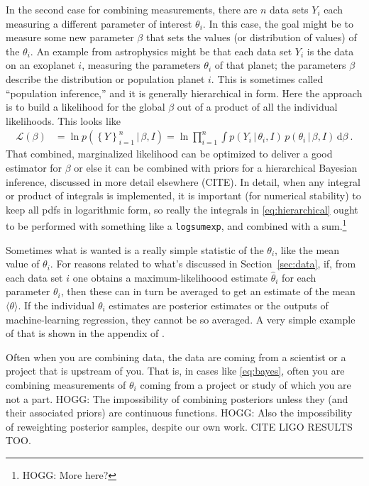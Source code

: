 \documentclass{article}
\newcommand{\sectionname}{Section}
\newcommand{\secref}[1]{\sectionname~\ref{#1}}
\newcommand{\dd}{\mathrm{d}}
\newcommand{\given}{\,|\,}
\newcommand{\setof}[1]{\left\{{#1}\right\}}
\begin{document}
In the second case for combining measurements, there are $n$ data sets $Y_i$ each measuring a different parameter of interest $\theta_i$.
In this case, the goal might be to measure some new parameter $\beta$ that sets the values (or distribution of values) of the $\theta_i$.
An example from astrophysics might be that each data set $Y_i$ is the data on an exoplanet $i$, measuring the parameters $\theta_i$ of that planet; the parameters $\beta$ describe the distribution or population planet $i$.
This is sometimes called ``population inference,'' and it is generally hierarchical in form.
Here the approach is to build a likelihood for the global $\beta$ out of a product of all the individual likelihoods.
This looks like
\begin{align}
    \mathscr{L}(\beta) &= \ln p(\setof{Y}_{i=1}^n\given\beta,I)
    = \ln\prod_{i=1}^n \int p(Y_i\given\theta_i,I)\,p(\theta_i\given\beta,I)\,\dd\beta ~.\label{eq:hierarchical}
\end{align}
That combined, marginalized likelihood can be optimized to deliver a good estimator for $\beta$ or else it can be combined with priors for a hierarchical Bayesian inference, discussed in more detail elsewhere (CITE).
In detail, when any integral or product of integrals is implemented, it is important (for numerical stability) to keep all pdfs in logarithmic form, so really the integrals in \eqref{eq:hierarchical} ought to be performed with something like a \texttt{logsumexp}, and combined with a sum.\footnote{HOGG: More here?}

Sometimes what is wanted is a really simple statistic of the $\theta_i$, like the mean value of $\theta_i$.
For reasons related to what's discussed in \secref{sec:data}, if, from each data set $i$ one obtains a maximum-likelihoood estimate $\hat\theta_i$ for each parameter $\theta_i$, then these can in turn be averaged to get an estimate of the mean $\langle\theta\rangle$.
If the individual $\theta_i$ estimates are posterior estimates or the outputs of machine-learning regression, they cannot be so averaged.
A very simple example of that is shown in the appendix of \cite{goodorbad}.

Often when you are combining data, the data are coming from a scientist or a project that is upstream of you.
That is, in cases like \eqref{eq:bayes}, often you are combining measurements of $\theta_i$ coming from a project or study of which you are not a part.
HOGG: The impossibility of combining posteriors unless they (and their associated priors) are continuous functions.
HOGG: Also the impossibility of reweighting posterior samples, despite our own work. CITE LIGO RESULTS TOO.
\end{document}
